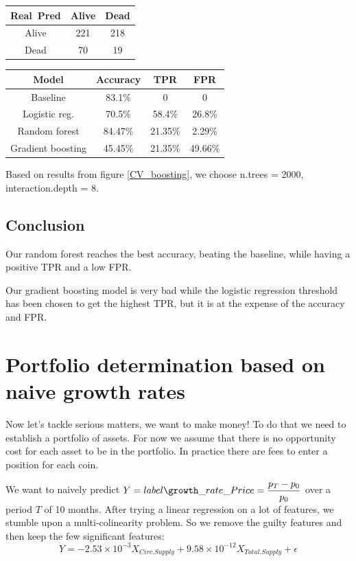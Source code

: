 \documentclass[11pt, english, letterpaper]{article}
\begin{document}
\begin{center}
    \begin{tabular}{c|cc}
    Real\ Pred    & Alive & Dead \\
          \hline
    Alive & 221  & 218  \\
    Dead  & 70   & 19  
    \end{tabular} \quad \quad
    \begin{tabular}{c|ccc}
    Model & Accuracy & TPR & FPR \\
          \hline
    Baseline  & 83.1\%   & 0 & 0\\
    Logistic reg. & 70.5\%  & 58.4\% & 26.8\%\\
    Random forest & 84.47\% & 21.35\% & 2.29\%\\
    Gradient boosting & 45.45\% & 21.35\% & 49.66\%
    \end{tabular}
\end{center}

Based on results from figure \ref{CV_boosting}, we choose n.trees = 2000, interaction.depth = 8.

\subsection{Conclusion}

Our random forest reaches the best accuracy, beating the baseline, while having a positive TPR and a low FPR.

Our gradient boosting model is very bad while the logistic regression threshold has been chosen to get the highest TPR, but it is at the expense of the accuracy and FPR.

\section{Portfolio determination based on naive growth rates}

Now let's tackle serious matters, we want to make money! To do that we need to establish a portfolio of assets. For now we assume that there is no opportunity cost for each asset to be in the portfolio. In practice there are fees to enter a position for each coin.

We want to naively predict $Y = label\growth\_rate\_Price = \dfrac{p_T-p_0}{p_0}$ over a period $T$ of 10 months.
After trying a linear regression on a lot of features, we stumble upon a multi-colinearity problem. So we remove the guilty features and then keep the few significant features:
$$Y = -2.53 \times 10^{-3} X_{Circ. Supply} + 9.58 \times 10^{-12} X_{Total. Supply} + \epsilon$$
\end{document}
